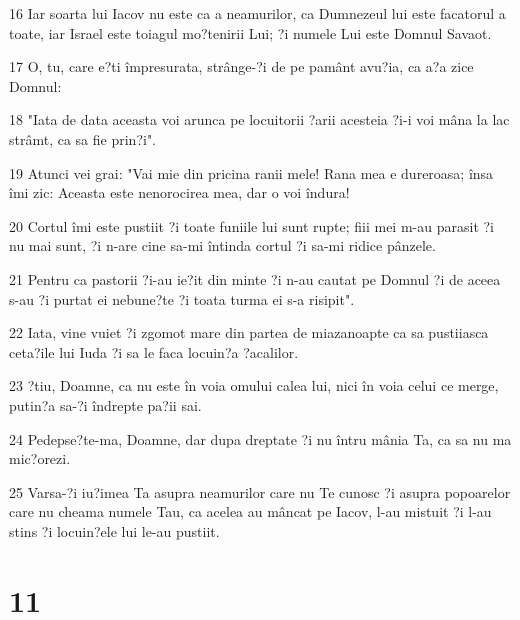 \par 16 Iar soarta lui Iacov nu este ca a neamurilor, ca Dumnezeul lui este facatorul a toate, iar Israel este toiagul mo?tenirii Lui; ?i numele Lui este Domnul Savaot.
\par 17 O, tu, care e?ti împresurata, strânge-?i de pe pamânt avu?ia, ca a?a zice Domnul:
\par 18 "Iata de data aceasta voi arunca pe locuitorii ?arii acesteia ?i-i voi mâna la lac strâmt, ca sa fie prin?i".
\par 19 Atunci vei grai: "Vai mie din pricina ranii mele! Rana mea e dureroasa; însa îmi zic: Aceasta este nenorocirea mea, dar o voi îndura!
\par 20 Cortul îmi este pustiit ?i toate funiile lui sunt rupte; fiii mei m-au parasit ?i nu mai sunt, ?i n-are cine sa-mi întinda cortul ?i sa-mi ridice pânzele.
\par 21 Pentru ca pastorii ?i-au ie?it din minte ?i n-au cautat pe Domnul ?i de aceea s-au ?i purtat ei nebune?te ?i toata turma ei s-a risipit".
\par 22 Iata, vine vuiet ?i zgomot mare din partea de miazanoapte ca sa pustiiasca ceta?ile lui Iuda ?i sa le faca locuin?a ?acalilor.
\par 23 ?tiu, Doamne, ca nu este în voia omului calea lui, nici în voia celui ce merge, putin?a sa-?i îndrepte pa?ii sai.
\par 24 Pedepse?te-ma, Doamne, dar dupa dreptate ?i nu întru mânia Ta, ca sa nu ma mic?orezi.
\par 25 Varsa-?i iu?imea Ta asupra neamurilor care nu Te cunosc ?i asupra popoarelor care nu cheama numele Tau, ca acelea au mâncat pe Iacov, l-au mistuit ?i l-au stins ?i locuin?ele lui le-au pustiit.

\chapter{11}


